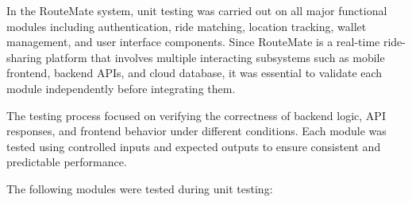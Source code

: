 \documentclass[10pt,a4paper]{report}
\begin{document}
\justify\large In the RouteMate system, unit testing was carried out on all major functional modules including authentication, ride matching, location tracking, wallet management, and user interface components. Since RouteMate is a real-time ride-sharing platform that involves multiple interacting subsystems such as mobile frontend, backend APIs, and cloud database, it was essential to validate each module independently before integrating them.

\justify\large The testing process focused on verifying the correctness of backend logic, API responses, and frontend behavior under different conditions. Each module was tested using controlled inputs and expected outputs to ensure consistent and predictable performance.

\justify\large The following modules were tested during unit testing:
\end{document}
